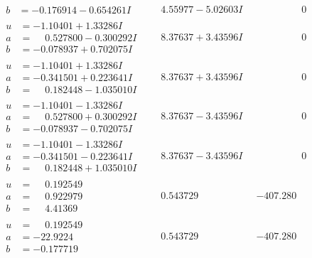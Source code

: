 \documentclass[1p]{elsarticle_modified}
\theoremstyle{definition}
\begin{document}
$$\begin{array}{c|c|c}
\begin{aligned}
b &= -0.176914 - 0.654261 I\end{aligned}
 & \phantom{-}4.55977 - 5.02603 I & \phantom{-0.000000 } 0 \\ \hline\begin{aligned}
u &= -1.10401 + 1.33286 I \\
a &= \phantom{-}0.527800 - 0.300292 I \\
b &= -0.078937 + 0.702075 I\end{aligned}
 & \phantom{-}8.37637 + 3.43596 I & \phantom{-0.000000 } 0 \\ \hline\begin{aligned}
u &= -1.10401 + 1.33286 I \\
a &= -0.341501 + 0.223641 I \\
b &= \phantom{-}0.182448 - 1.035010 I\end{aligned}
 & \phantom{-}8.37637 + 3.43596 I & \phantom{-0.000000 } 0 \\ \hline\begin{aligned}
u &= -1.10401 - 1.33286 I \\
a &= \phantom{-}0.527800 + 0.300292 I \\
b &= -0.078937 - 0.702075 I\end{aligned}
 & \phantom{-}8.37637 - 3.43596 I & \phantom{-0.000000 } 0 \\ \hline\begin{aligned}
u &= -1.10401 - 1.33286 I \\
a &= -0.341501 - 0.223641 I \\
b &= \phantom{-}0.182448 + 1.035010 I\end{aligned}
 & \phantom{-}8.37637 - 3.43596 I & \phantom{-0.000000 } 0 \\ \hline\begin{aligned}
u &= \phantom{-}0.192549\phantom{ +0.000000I} \\
a &= \phantom{-}0.922979\phantom{ +0.000000I} \\
b &= \phantom{-}4.41369\phantom{ +0.000000I}\end{aligned}
 & \phantom{-}0.543729\phantom{ +0.000000I} & -407.280\phantom{ +0.000000I} \\ \hline\begin{aligned}
u &= \phantom{-}0.192549\phantom{ +0.000000I} \\
a &= -22.9224\phantom{ +0.000000I} \\
b &= -0.177719\phantom{ +0.000000I}\end{aligned}
 & \phantom{-}0.543729\phantom{ +0.000000I} & -407.280\phantom{ +0.000000I} \\ \hline\begin{aligned}

\end{aligned}
\end{array}$$
\end{document}
